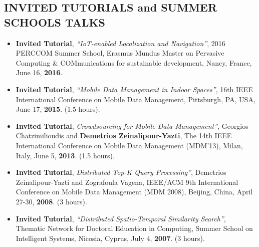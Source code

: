 \documentclass[10pt]{article}
\begin{document}
\subsection*{\bf INVITED TUTORIALS and SUMMER SCHOOLS TALKS}
\begin{itemize}
\setlength{\itemsep}{0.10ex}
\item  {\bf Invited Tutorial}, {\em ``IoT-enabled Localization and Navigation''}, 2016 PERCCOM Summer School, Erasmus Mundus Master on Pervasive Computing \& COMmunications for sustainable development, Nancy, France, June 16, {\bf 2016}.
\item  {\bf Invited Tutorial}, {\em ``Mobile Data Management in Indoor Spaces''}, 16th IEEE International Conference on Mobile Data Management, Pittsburgh, PA, USA, June 17, {\bf 2015}. (1.5 hours).
\item {\bf Invited Tutorial}, {\em Crowdsourcing for Mobile Data Management''}, Georgios Chatzimilioudis and {\bf Demetrios Zeinalipour-Yazti}, The 14th IEEE International Conference on Mobile Data Management (MDM'13), Milan, Italy, June 5, {\bf 2013}. (1.5 hours).
\item {\bf Invited Tutorial}, {\em Distributed Top-K Query Processing''}, Demetrios Zeinalipour-Yazti and Zografoula Vagena, IEEE/ACM 9th International Conference on Mobile Data Management (MDM 2008), Beijing, China, April 27-30, {\bf 2008}. (3 hours).
\item  {\bf Invited Tutorial}, {\em ``Distributed Spatio-Temporal Similarity Search''}, 
 Thematic Network for Doctoral Education in Computing, Summer School on Intelligent Systems, Nicosia, Cyprus, July 4, {\bf 2007}. (3 hours).
\end{itemize}
\end{document}
